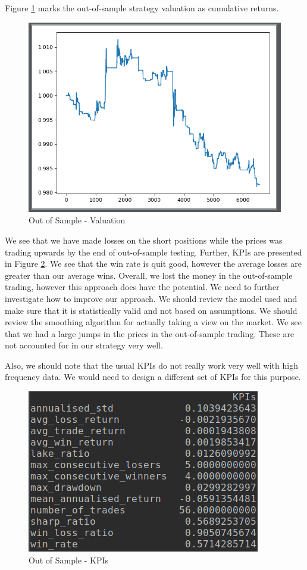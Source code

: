 \documentclass[12pt]{article}
\begin{document}
Figure \ref{fig:osvaluation} marks the out-of-sample strategy valuation as cumulative returns.
\begin{figure}[h!]
	\centering
  \includegraphics[scale=0.4]{os_val.png}
  \caption{Out of Sample - Valuation}
  \label{fig:osvaluation}
\end{figure}
\FloatBarrier
We see that we have made losses on the short positions while the prices was trading upwards by the end of out-of-sample testing. Further, KPIs are presented in Figure \ref{fig:oskpi}. We see that the win rate is quit good, however the average losses are greater than our average wins. Overall, we lost the money in the out-of-sample trading, however this approach does have the potential. We need to further investigate how to improve our approach. We should review the model used and make sure that it is statistically valid and not based on assumptions. We should review the smoothing algorithm for actually taking a view on the market. We see that we had a large jumps in the prices in the out-of-sample trading. These are not accounted for in our strategy very well.

Also, we should note that the usual KPIs do not really work very well with high frequency data. We would need to design a different set of KPIs for this purpose.

\begin{figure}[h!]
	\centering
  \includegraphics[scale=0.4]{os_kpi.png}
  \caption{Out of Sample - KPIs}
  \label{fig:oskpi}
\end{figure}
\FloatBarrier
\end{document}
